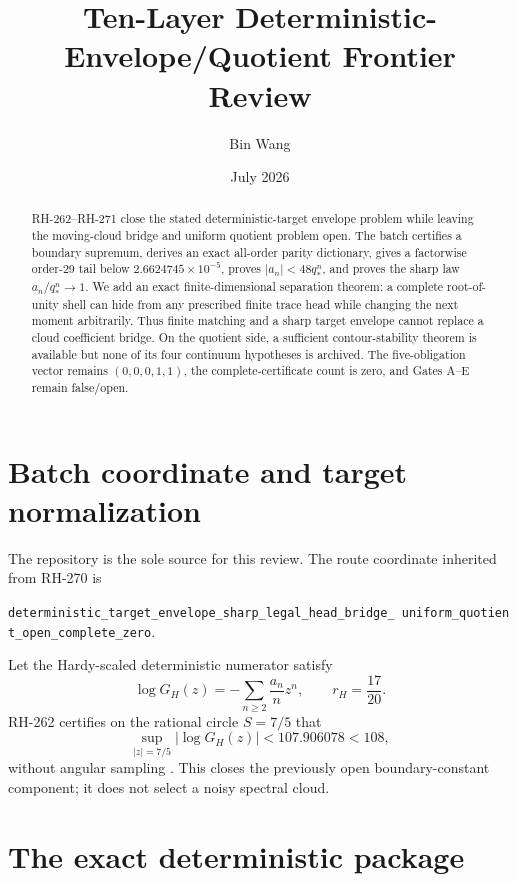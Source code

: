 \documentclass[11pt]{article}
\title{Ten-Layer Deterministic-Envelope/Quotient Frontier Review}
\author{Bin Wang}
\date{July 2026}
\theoremstyle{remark}
\begin{document}
\maketitle
\sloppy

\begin{abstract}
RH-262--RH-271 close the stated deterministic-target envelope problem while
leaving the moving-cloud bridge and uniform quotient problem open.  The batch
certifies a boundary supremum, derives an exact all-order parity dictionary,
gives a factorwise order-29 tail below $2.6624745\times10^{-5}$, proves
$|a_n|<48q_*^n$, and proves the sharp law $a_n/q_*^n\to1$.  We add an exact
finite-dimensional separation theorem: a complete root-of-unity shell can
hide from any prescribed finite trace head while changing the next moment
arbitrarily.  Thus finite matching and a sharp target envelope cannot replace
a cloud coefficient bridge.  On the quotient side, a sufficient
contour-stability theorem is available but none of its four continuum
hypotheses is archived.  The five-obligation vector remains $(0,0,0,1,1)$,
the complete-certificate count is zero, and Gates A--E remain false/open.
\end{abstract}

\section{Batch coordinate and target normalization}

The repository is the sole source for this review.  The route coordinate
inherited from RH-270 is
\begin{center}
\texttt{deterministic\_target\_envelope\_sharp\_legal\_head\_bridge\_\
uniform\_quotient\_open\_complete\_zero}.
\end{center}
Let the Hardy-scaled deterministic numerator satisfy
\begin{equation}
 \log G_H(z)=-\sum_{n\ge2}\frac{a_n}{n}z^n,
 \qquad r_H=\frac{17}{20}.
 \label{eq:target}
\end{equation}
RH-262 certifies on the rational circle $S=7/5$ that
\begin{equation}
 \sup_{|z|=7/5}|\log G_H(z)|<107.906078<108,
 \label{eq:boundary}
\end{equation}
without angular sampling \citep{WangRH262}.  This closes the previously open
boundary-constant component; it does not select a noisy spectral cloud.

\section{The exact deterministic package}
\end{document}
